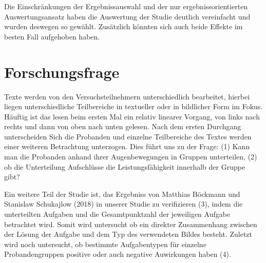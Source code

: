 Die Einschränkungen der Ergebnissauswahl und der nur ergebnissorientierten Auswertungsansatz haben die Auswertung der Studie deutlich vereinfacht und wurden deswegen so gewählt. Zusätzlich könnten sich auch beide Effekte im besten Fall aufgehoben haben.  

\section{Forschungsfrage}
Texte werden von den Versuchsteilnehmern unterschiedlich bearbeitet, hierbei liegen unterschiedliche Teilbereiche in textueller oder in bildlicher Form im Fokus. Häuftig ist das lesen beim ersten Mal ein relativ linearer Vorgang, von links nach rechts und dann von oben nach unten gelesen. Nach dem ersten Durchgang unterscheiden Sich die Probanden und einzelne Teilbereiche des Textes werden einer weiteren Betrachtung unterzogen. Dies führt uns zu der Frage:
(1) Kann man die Probanden anhand ihrer Augenbewegungen in Gruppen unterteilen, (2) ob die Unterteilung Aufschlüsse die Leistungsfähigkeit innerhalb der Gruppe gibt?

Ein weitere Teil der Studie ist, das Ergebniss von Matthias Böckmann und Stanislaw Schukajlow (2018) in unserer Studie zu verifizieren (3), indem die unterteilten Aufgaben und die Gesamtpunktzahl der jeweiligen Aufgabe betrachtet wird. Somit wird untersucht ob ein direkter Zusammenhang zwischen der Lösung der Aufgabe und dem Typ des verwendeten Bildes besteht. Zuletzt wird noch untersucht, ob bestimmte Aufgabentypen für einzelne Probandengruppen positive oder auch negative Auwirkungen haben (4).
